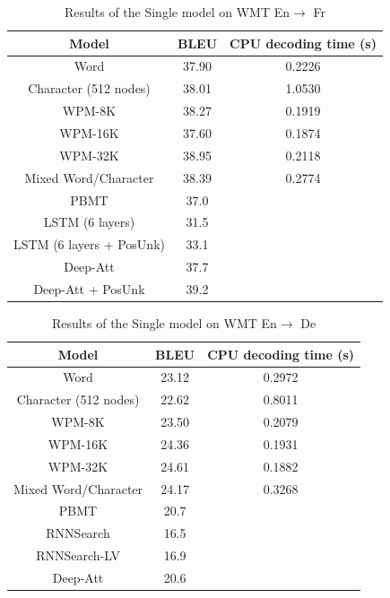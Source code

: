 \begin{table}[h!]
\centering
 \begin{tabular}{ |ccc| } 
  \hline Model & BLEU &  CPU decoding time
 (s) \\ 
  \hline  Word &  37.90 & 0.2226\\
  Character (512 nodes)& 38.01 & 1.0530\\
  WPM-8K & 38.27 &  0.1919\\
  WPM-16K &  37.60 & 0.1874\\
  WPM-32K & 38.95 &  0.2118\\
  Mixed Word/Character & 38.39 &  0.2774\\
  \hline PBMT \citep{durrani} & 37.0 &\\
  LSTM (6 layers)\citep{DBLP:journals/corr/LuongSLVZ14}  &  31.5 & \\
  LSTM (6 layers + PosUnk) \citep{DBLP:journals/corr/LuongSLVZ14} &33.1&\\
  Deep-Att \citep{DBLP:journals/corr/ZhouCWLX16} &  37.7&\\
  Deep-Att + PosUnk \citep{DBLP:journals/corr/ZhouCWLX16} &39.2&\\
  \hline
 \end{tabular}
\caption{Results of the Single model on WMT En$\rightarrow$ Fr \citep{45610}}
\end{table}

\begin{table}[h!]
\centering
 \begin{tabular}{ |ccc| } 
  \hline Model & BLEU &  CPU decoding time
 (s) \\ 
  \hline  Word &  23.12 & 0.2972\\
  Character (512 nodes)& 22.62 & 0.8011\\
  WPM-8K & 23.50 &  0.2079\\
  WPM-16K & 24.36 & 0.1931\\
  WPM-32K & 24.61 & 0.1882\\
  Mixed Word/Character & 24.17 & 0.3268\\
  \hline PBMT \citep{durrani} & 20.7 &\\
  RNNSearch \citep{DBLP:journals/corr/LuongSLVZ14}  &  16.5 & \\
  RNNSearch-LV \citep{DBLP:journals/corr/LuongSLVZ14} &16.9&\\
  Deep-Att \citep{DBLP:journals/corr/ZhouCWLX16}& 20.6&\\
  \hline
 \end{tabular}
\caption{Results of the Single model on WMT En$\rightarrow$ De \citep{45610}}
\end{table}


